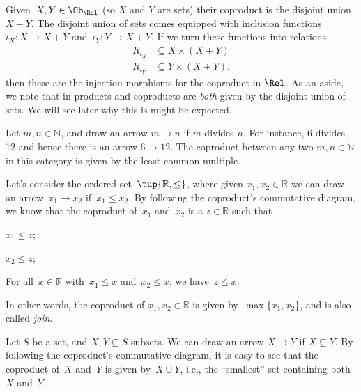 \begin{example}
Given~$X,Y\in \Ob_\Rel$ (so $X$ and $Y$ are sets) their coproduct is the disjoint union~$X+Y$. The disjoint union of sets comes equipped with inclusion functions~$\iota_X\colon X\to X+Y$ and~$\iota_Y\colon Y\to X+Y$. If we turn these functions into relations
\begin{equation*}
\begin{aligned}
    R_{\iota_X}&\subseteq X\times (X+Y)\\
    R_{\iota_Y}&\subseteq Y\times (X+Y).
\end{aligned}
\end{equation*}
then these are the injection morphisms for the coproduct in $\Rel$.
As an aside, we note that in \Rel products and coproducts are \emph{both} given by the disjoint union of sets. We will see later why this is might be expected.
\end{example}

\begin{example}
Let $m,n\in \mathbb{N}$, and draw an arrow $m\to n$ if $m$ divides $n$. For instance, 6 divides 12 and hence there is an arrow $6\to 12$. The coproduct between any two $m,n\in \mathbb{N}$ in this category is given by the least common multiple.
\end{example}

\begin{example}
Let's consider the ordered set~$\tup{\mathbb{R},\leq}$, where given $x_1,x_2\in \mathbb{R}$ we can draw an arrow~$x_1\to x_2$ if~$x_1\leq x_2$. By following the coproduct's commutative diagram, we know that the coproduct of~$x_1$ and~$x_2$ is a $z\in \mathbb{R}$ such that
\begin{compactitem}
\item $x_1\leq z$;
\item $x_2\leq z$;
\item For all~$x\in \mathbb{R}$ with~$x_1\leq x$ and~$x_2\leq x$, we have~$z\leq x$.
\end{compactitem}
In other words, the coproduct of $x_1,x_2\in \mathbb{R}$ is given by~$\max\{x_1,x_2\}$, and is also called \emph{join}.
\end{example}

\begin{example}
\label{ex:subset_coprod}
Let $S$ be a set, and $X,Y\subseteq S$ subsets. We can draw an arrow $X\to Y$ if $X\subseteq Y$. By following the coproduct's commutative diagram, it is easy to see that the coproduct of~$X$ and~$Y$ is given by~$X\cup Y$, i.e., the ``smallest'' set containing both~$X$ and~$Y$.
\end{example}

